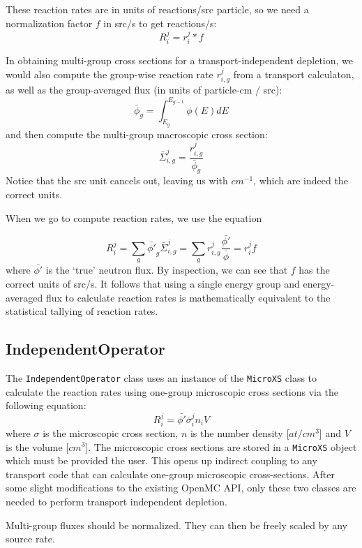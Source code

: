         These reaction rates are in units of reactions/src particle, so we need
        a normalization factor $f$ in src/s to get reactions/s:
        \begin{equation}
            R^j_i = r^j_i * f
        \end{equation}

        In obtaining multi-group cross sections for a transport-independent
        depletion, we would also compute the group-wise reaction rate
        $r^j_{i,g}$ from a transport calculaton, as well as the group-averaged
        flux (in units of particle-cm / src):
        \begin{equation}
            \bar{\phi}_{g} = \int_{E_{g}}^{E_{g-1}} \phi(E) dE
        \end{equation}
        and then compute the multi-group macroscopic cross section:
        \begin{equation}
            \bar{\Sigma}^j_{i,g} = \frac{r^j_{i,g}}{\bar{\phi}_{g}}
        \end{equation}
        Notice that the src unit cancels out, leaving us with $cm^{-1}$, which
        are indeed the correct units.

        When we go to compute reaction rates, we use the equation 

        \begin{equation}
            R^j_i = \sum_{g} \bar{\phi'}_{g} \bar\Sigma^j_{i,g} = \sum_{g}
            r^j_{i,g}\frac{\bar{\phi'}}{\bar{\phi}} = r^j_i f
        \end{equation}
        where $\bar{\phi'}$ is the `true' neutron flux. By inspection, we can
        see that $f$ has the correct units of src/s. It follows that using a
        single energy group and energy-averaged flux to calculate reaction rates
        is mathematically equivalent to the statistical tallying of reaction
        rates.

            
    \subsection{IndependentOperator}
        The \verb.IndependentOperator. class uses an instance of the
        \verb.MicroXS. class to calculate the reaction rates using one-group
        microscopic cross sections via the following equation:
        \begin{equation}
            R^j_i = \bar{\phi'} \bar{\sigma}^j_i n_i V
        \end{equation}
        where $\sigma$ is the microscopic cross section, $n$ is the number
        density [$at/cm^3$] and $V$ is the volume [$cm^3$]. The microscopic
        cross sections are stored in a \verb.MicroXS. object which must be
        provided the user. This opens up indirect coupling to any transport code
        that can calculate one-group microscopic cross-sections. After some
        slight modifications to the existing OpenMC API, only these two classes
        are needed to perform transport independent depletion.

        Multi-group fluxes should be normalized. They can then be freely scaled
        by any source rate.

